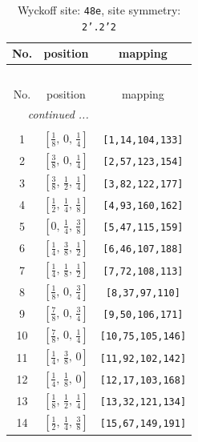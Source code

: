 \documentclass[fleqn,8pt]{jsarticle}
\begin{document}
\begin{longtable}{ccc}
\caption{Wyckoff site: {\tt 48e}, site symmetry: {\tt 2'.2'2}}
 \\
 \hline \hline
No. & position & mapping \\ \hline \endfirsthead

\multicolumn{2}{l}{\tablename\ \thetable{}} \\
 \hline \hline
No. & position & mapping \\ \hline \endhead

 \hline \hline
\multicolumn{2}{r}{\footnotesize\it continued ...} \\ \endfoot

 \hline \hline
\multicolumn{2}{r}{} \\ \endlastfoot

1 & $\left[ \frac{1}{8},\, 0,\, \frac{1}{4} \right]$ & {\tt [1,14,104,133]} \\ \hline
2 & $\left[ \frac{3}{8},\, 0,\, \frac{1}{4} \right]$ & {\tt [2,57,123,154]} \\ \hline
3 & $\left[ \frac{3}{8},\, \frac{1}{2},\, \frac{1}{4} \right]$ & {\tt [3,82,122,177]} \\ \hline
4 & $\left[ \frac{1}{2},\, \frac{1}{4},\, \frac{1}{8} \right]$ & {\tt [4,93,160,162]} \\ \hline
5 & $\left[ 0,\, \frac{1}{4},\, \frac{3}{8} \right]$ & {\tt [5,47,115,159]} \\ \hline
6 & $\left[ \frac{1}{4},\, \frac{3}{8},\, \frac{1}{2} \right]$ & {\tt [6,46,107,188]} \\ \hline
7 & $\left[ \frac{1}{4},\, \frac{1}{8},\, \frac{1}{2} \right]$ & {\tt [7,72,108,113]} \\ \hline
8 & $\left[ \frac{1}{8},\, 0,\, \frac{3}{4} \right]$ & {\tt [8,37,97,110]} \\ \hline
9 & $\left[ \frac{7}{8},\, 0,\, \frac{3}{4} \right]$ & {\tt [9,50,106,171]} \\ \hline
10 & $\left[ \frac{7}{8},\, 0,\, \frac{1}{4} \right]$ & {\tt [10,75,105,146]} \\ \hline
11 & $\left[ \frac{1}{4},\, \frac{3}{8},\, 0 \right]$ & {\tt [11,92,102,142]} \\ \hline
12 & $\left[ \frac{1}{4},\, \frac{1}{8},\, 0 \right]$ & {\tt [12,17,103,168]} \\ \hline
13 & $\left[ \frac{1}{8},\, \frac{1}{2},\, \frac{1}{4} \right]$ & {\tt [13,32,121,134]} \\ \hline
14 & $\left[ \frac{1}{2},\, \frac{1}{4},\, \frac{3}{8} \right]$ & {\tt [15,67,149,191]} \\ \hline

\end{longtable}
\end{document}
